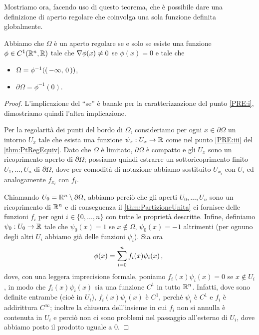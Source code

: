 Mostriamo ora, facendo uso di questo teorema, che è possibile dare una definizione di aperto regolare che coinvolga una sola funzione definita globalmente.

\begin{lemma}\label{lemma:EquivRegolare}
	Abbiamo che $\Omega$ è un aperto regolare se e solo se esiste una funzione $\phi\in C^1(\mathbb R^n,\mathbb R)$ tale che $\nabla \phi(x)\neq 0$ se $\phi(x)=0$ e tale che
	\begin{itemize}
		\item $\Omega = \phi^{-1}(\left(\,-\infty,\,0\,\right))$,
		\item $\partial \Omega = \phi^{-1}(0)$.
	\end{itemize}
\end{lemma}

\begin{proof}
	L'implicazione del ``se'' è banale per la caratterizzazione del punto \ref{PRE:i}, dimostriamo quindi l'altra implicazione. 
	
	Per la regolarità dei punti
	del bordo di $\Omega$, consideriamo per ogni $x\in\partial \Omega$ un intorno $U_x$ tale che esista una funzione $\psi_x:U_x\rightarrow \mathbb R$
	come nel punto \ref{PRE:iii} del \cref{thm:PtRegEquiv}. Dato che $\Omega$ è limitato, $\partial\Omega$ è compatto e gli $U_x$ sono un ricoprimento aperto di $\partial \Omega$; possiamo
	quindi estrarre un sottoricoprimento finito $U_1, \dots, U_n$ di $\partial\Omega$, dove per comodità di notazione abbiamo sostituito $U_{x_i}$ con $U_i$ ed analogamente $f_{x_i}$ con $f_i$. 
	
	Chiamando $U_0 = \mathbb R^n \setminus \partial \Omega$,
	abbiamo perciò che gli aperti $U_0,\dots,U_n$ sono un ricoprimento di $\mathbb R^n$ e di conseguenza
	il \cref{thm:PartizioneUnita} ci fornisce delle funzioni $f_i$ per ogni $i\in\{0,\dots, n\}$ con tutte le proprietà descritte.
	Infine, definiamo $\psi_0:U_0\rightarrow \mathbb R$ tale che $\psi_0(x)=1$ se $x\notin \Omega$, $\psi_0(x)=-1$ altrimenti (per ognuno degli altri $U_i$ abbiamo già delle funzioni $\psi_i$). Sia ora 
	\[
		\phi(x)=\sum_{i=0}^n f_i(x) \psi_i(x)\, \text{, }
	\]
	dove, con una leggera imprecisione formale, poniamo $f_i(x) \psi_i(x) = 0$ se $x\notin U_i$, in modo che $f_i(x) \psi_i(x)$ sia una funzione
	$C^1$ in tutto $\mathbb R^n$. Infatti, dove sono definite entrambe (cioè in $U_i$), $f_i(x)\psi_i(x)$ è $C^1$, perché $\psi_i$ è $C^1$ e $f_i$ è addirittura $C^{\infty}$; inoltre la chiusura dell'insieme in cui $f_i$ non si annulla è contenuta in $U_i$ e perciò non ci sono problemi nel passaggio all'esterno di $U_i$, dove abbiamo posto il prodotto uguale a 0.
	

\end{proof}
